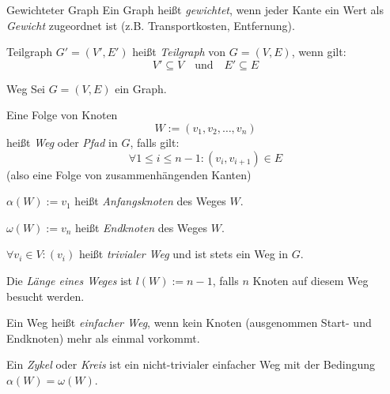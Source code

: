 \documentclass[german]{../spicker}
\begin{document}
\begin{defi}{Gewichteter Graph}
    Ein Graph heißt \emph{gewichtet}, wenn jeder Kante ein Wert als \emph{Gewicht} zugeordnet ist (z.B. Transportkosten, Entfernung).

    \begin{center}
    \end{center}
\end{defi}

\begin{defi}{Teilgraph}
    $G' = (V', E')$ heißt \emph{Teilgraph} von $G=(V, E)$, wenn gilt:
    $$
        V' \subseteq V \quad \text{und} \quad E' \subseteq E
    $$
\end{defi}

\begin{defi}{Weg}
    Sei $G = (V, E)$ ein Graph.

    Eine Folge von Knoten
    $$
        W := (v_1, v_2, \ldots, v_n)
    $$
    heißt \emph{Weg} oder \emph{Pfad} in $G$, falls gilt:
    $$
        \forall 1 \leq i \leq n-1 : (v_i, v_{i+1}) \in E
    $$
    (also eine Folge von zusammenhängenden Kanten)

    $\alpha(W) := v_1$ heißt \emph{Anfangsknoten} des Weges $W$.

    $\omega(W) := v_n$ heißt \emph{Endknoten} des Weges $W$.

    $\forall v_i \in V : (v_i)$ heißt \emph{trivialer Weg} und ist stets ein Weg in $G$.

    Die \emph{Länge eines Weges} ist $l(W) := n-1$, falls $n$ Knoten auf diesem Weg besucht werden.

    Ein Weg heißt \emph{einfacher Weg}, wenn kein Knoten (ausgenommen Start- und Endknoten) mehr als einmal vorkommt.

    Ein \emph{Zykel} oder \emph{Kreis} ist ein nicht-trivialer einfacher Weg mit der Bedingung $\alpha(W) = \omega(W)$.
\end{defi}
\end{document}
